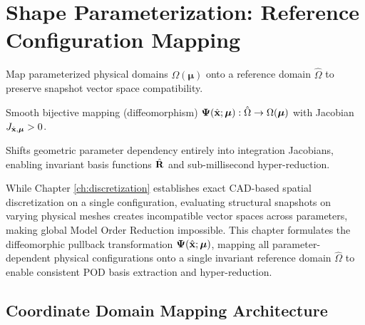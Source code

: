 \chapter{Shape Parameterization: Reference Configuration Mapping}
\label{ch:pullback}

\begin{tcolorbox}[colback=lightbg, colframe=primaryblue, title=\textbf{Chapter at a Glance: Reference Diffeomorphic Mapping}, fonttitle=\bfseries]
    \begin{description}[leftmargin=!, labelwidth=3.4cm]
        \item[\textbf{Core Objective}] Map parameterized physical domains $\Omega(\boldsymbol{\mu})$ onto a reference domain $\hat{\Omega}$ to preserve snapshot vector space compatibility.
        \item[\textbf{Mathematical Tool}] Smooth bijective mapping (diffeomorphism) $\boldsymbol{\Psi}(\hat{\mathbf{x}}; \boldsymbol{\mu}): \hat{\Omega} \to \Omega(\boldsymbol{\mu})$ with Jacobian $J_{\hat{\mathbf{x}}, \boldsymbol{\mu}} > 0$.
        \item[\textbf{Key Result}] Shifts geometric parameter dependency entirely into integration Jacobians, enabling invariant basis functions $\hat{\mathbf{R}}$ and sub-millisecond hyper-reduction.
    \end{description}
\end{tcolorbox}

While Chapter \ref{ch:discretization} establishes exact CAD-based spatial discretization on a single configuration, evaluating structural snapshots on varying physical meshes creates incompatible vector spaces across parameters, making global Model Order Reduction impossible. This chapter formulates the diffeomorphic pullback transformation $\boldsymbol{\Psi}(\hat{\mathbf{x}}; \boldsymbol{\mu})$, mapping all parameter-dependent physical configurations onto a single invariant reference domain $\hat{\Omega}$ to enable consistent POD basis extraction and hyper-reduction.

\section{Coordinate Domain Mapping Architecture}

